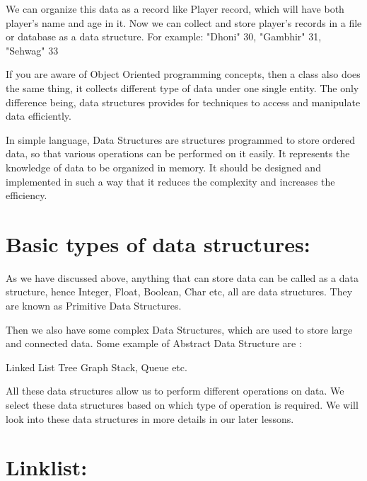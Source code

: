 \documentclass{article}
\begin{document}
   

We can organize this data as a record like Player record, which will have both player's name and age in it. Now we can collect and store player's records in a file or database as a data structure. For example: "Dhoni" 30, "Gambhir" 31, "Sehwag" 33



If you are aware of Object Oriented programming concepts, then a class also does the same thing, it collects different type of data under one single entity. The only difference being, data structures provides for techniques to access and manipulate data efficiently.




In simple language, Data Structures are structures programmed to store ordered data, so that various operations can be performed on it easily. It represents the knowledge of data to be organized in memory. It should be designed and implemented in such a way that it reduces the complexity and increases the efficiency.

 
    \section{Basic types of data structures:}\label{subsec:Bas}
    
    
    
    As we have discussed above, anything that can store data can be called as a data structure, hence Integer, Float, Boolean, Char etc, all are data structures. They are known as Primitive Data Structures.

Then we also have some complex Data Structures, which are used to store large and connected data. Some example of Abstract Data Structure are :

    Linked List
    Tree
    Graph
    Stack, Queue etc.

All these data structures allow us to perform      different operations on data. We select these   data structures based on which type of operation is required. We will look into these data structures in more details in our later lessons.

  
\section{Linklist:}\label{sec:link}
\end{document}
